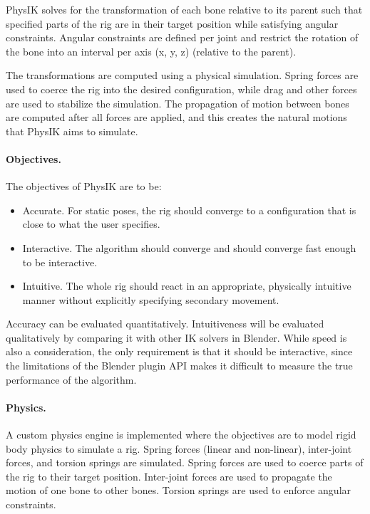 \documentclass[10pt,twocolumn,letterpaper]{article}
\begin{document}
PhysIK solves for the transformation of each bone relative to its parent such that specified parts of the rig are in their target position while satisfying angular constraints. Angular constraints are defined per joint and restrict the rotation of the bone into an interval per axis (x, y, z) (relative to the parent). 

The transformations are computed using a physical simulation. Spring forces are used to coerce the rig into the desired configuration, while drag and other forces are used to stabilize the simulation. The propagation of motion between bones are computed after all forces are applied, and this creates the natural motions that PhysIK aims to simulate.

\paragraph{Objectives.} The objectives of PhysIK are to be:
\begin{itemize}
    \item Accurate. For static poses, the rig should converge to a configuration that is close to what the user specifies.
    \item Interactive. The algorithm should converge and should converge fast enough to be interactive. 
    \item Intuitive. The whole rig should react in an appropriate, physically intuitive manner without explicitly specifying secondary movement. 
\end{itemize}

Accuracy can be evaluated quantitatively. Intuitiveness will be evaluated qualitatively by comparing it with other IK solvers in Blender. While speed is also a consideration, the only requirement is that it should be interactive, since the limitations of the Blender plugin API makes it difficult to measure the true performance of the algorithm.

\paragraph{Physics.} A custom physics engine is implemented where the objectives are to model rigid body physics to simulate a rig. Spring forces (linear and non-linear), inter-joint forces, and torsion springs are simulated.
Spring forces are used to coerce parts of the rig to their target position. Inter-joint forces are used to propagate the motion of one bone to other bones. Torsion springs are used to enforce angular constraints.
\end{document}
